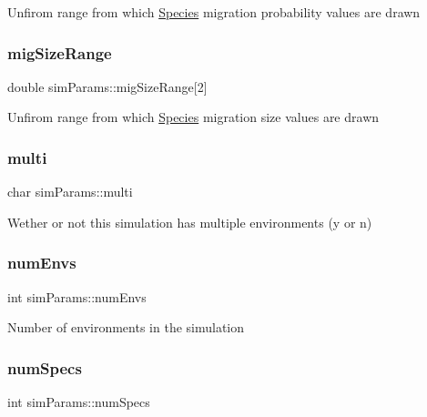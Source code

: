 Unfirom range from which \hyperlink{classSpecies}{Species} migration probability values are drawn \mbox{\label{structsimParams_a2486796d56e9fbe5d9f2dbd507a6ce5d}} 
\subsubsection{\texorpdfstring{mig\+Size\+Range}{migSizeRange}}
{\footnotesize\ttfamily double sim\+Params\+::mig\+Size\+Range\mbox{[}2\mbox{]}}

Unfirom range from which \hyperlink{classSpecies}{Species} migration size values are drawn \mbox{\label{structsimParams_a2c0a57da585258a84362a2c297ee44cb}} 
\subsubsection{\texorpdfstring{multi}{multi}}
{\footnotesize\ttfamily char sim\+Params\+::multi}

Wether or not this simulation has multiple environments (\textquotesingle{}y\textquotesingle{} or \textquotesingle{}n\textquotesingle{}) \mbox{\label{structsimParams_a5d284deecb9cbd1b2680670822cae29a}} 
\subsubsection{\texorpdfstring{num\+Envs}{numEnvs}}
{\footnotesize\ttfamily int sim\+Params\+::num\+Envs}

Number of environments in the simulation \mbox{\label{structsimParams_a83b3c9f8e5dee0b7b4e63a17dc2646bd}} 
\subsubsection{\texorpdfstring{num\+Specs}{numSpecs}}
{\footnotesize\ttfamily int sim\+Params\+::num\+Specs}

